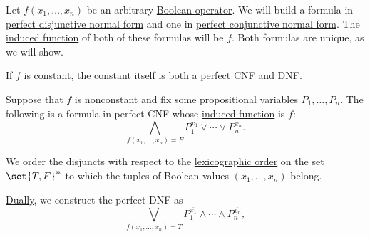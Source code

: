 \begin{algorithm}\label{alg:perfect_cnf_and_dnf}
  Let \( f(x_1, \ldots, x_n) \) be an arbitrary \hyperref[def:boolean_operator]{Boolean operator}. We will build a formula in \hyperref[def:cnf_and_dnf/perfect]{perfect disjunctive normal form} and one in \hyperref[def:cnf_and_dnf/perfect]{perfect conjunctive normal form}. The \hyperref[def:propositional_valuation/valuation_function]{induced function} of both of these formulas will be \( f \). Both formulas are unique, as we will show.

  \begin{thmenum}
     If \( f \) is constant, the constant itself is both a perfect CNF and DNF.

     Suppose that \( f \) is nonconstant and fix some propositional variables \( P_1, \ldots, P_n \). The following is a formula in perfect CNF whose \hyperref[def:propositional_valuation/valuation_function]{induced function} is \( f \):
    \begin{equation}\label{alg:perfect_cnf_and_dnf/cnf}
      \bigwedge_{f(x_1, \ldots, x_n) = F} P_1^{x_1} \vee \cdots \vee P_n^{x_n}.
    \end{equation}

    We order the disjuncts with respect to the \hyperref[def:lexicographic_order]{lexicographic order} on the set \( \set{ T, F }^n \) to which the tuples of Boolean values \( (x_1, \ldots, x_n) \) belong.

    \hyperref[def:semilattice/duality]{Dually}, we construct the perfect DNF as
    \begin{equation}\label{alg:perfect_cnf_and_dnf/dnf}
      \bigvee_{f(x_1, \ldots, x_n) = T} P_1^{\overline{x_1}} \wedge \cdots \wedge P_n^{\overline{x_n}},
    \end{equation}
  \end{thmenum}
\end{algorithm}
